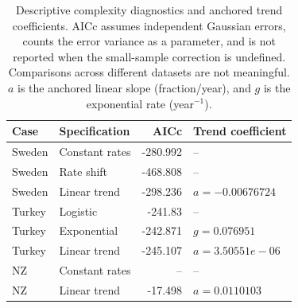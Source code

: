 \begin{table}[!htbp]\centering\small
\caption{Descriptive complexity diagnostics and anchored trend coefficients. AICc assumes independent Gaussian errors, counts the error variance as a parameter, and is not reported when the small-sample correction is undefined. Comparisons across different datasets are not meaningful. $a$ is the anchored linear slope (fraction/year), and $g$ is the exponential rate (year$^{-1}$).}\label{tab:aicc}
\begin{tabular}{llrl}\toprule Case & Specification & AICc & Trend coefficient\\\midrule
Sweden & Constant rates & -280.992 & --\\
Sweden & Rate shift & -468.808 & --\\
Sweden & Linear trend & -298.236 & $a=-0.00676724$\\
Turkey & Logistic & -241.83 & --\\
Turkey & Exponential & -242.871 & $g=0.076951$\\
Turkey & Linear trend & -245.107 & $a=3.50551e-06$\\
NZ & Constant rates & -- & --\\
NZ & Linear trend & -17.498 & $a=0.0110103$\\
\bottomrule\end{tabular}\end{table}
